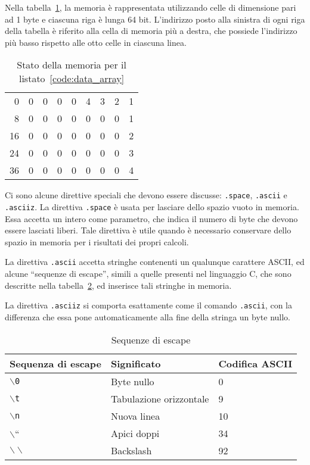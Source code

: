 \documentclass[12pt]{report}
\begin{document}
Nella tabella~\ref{table:effect}, la memoria \`{e} rappresentata utilizzando celle di dimensione pari 
ad 1 byte e ciascuna riga \`{e} lunga 64 bit. L'indirizzo posto alla sinistra di ogni riga della tabella \`{e} 
riferito alla cella di memoria pi\`{u} a destra, che possiede l'indirizzo pi\`{u} basso rispetto alle otto celle in ciascuna linea.

\begin{table}[htb]
	\begin{centering}
		\begin{tabular}{r|c|c|c|c|c|c|c|c|}
			\cline{2-9}
			0 & 0 & 0 & 0 & 0 &4 & 3 &2 &1 \\
			\cline{2-9}
			8 & 0 & 0 & 0 & 0 &0 & 0 &0 &1 \\
			\cline{2-9}
			16 & 0 & 0 & 0 & 0 &0 & 0 &0 &2 \\
			\cline{2-9}
			24 & 0 & 0 & 0 & 0 &0 & 0 &0 &3 \\
			\cline{2-9}
			36 & 0 & 0 & 0 & 0 &0 & 0 &0 &4\\ 
			\cline{2-9}
		\end{tabular}
		\caption{Stato della memoria per il listato~\ref{code:data_array}}
		\label{table:effect}
	\end{centering}
\end{table}
Ci sono alcune direttive speciali che devono essere discusse: \texttt{.space}, 
\texttt{.ascii} e \texttt{.asciiz}.
La direttiva \texttt{.space} \`{e} usata per lasciare dello spazio vuoto in memoria. 
Essa accetta un intero come parametro, che indica il numero di byte che devono essere lasciati liberi. 
Tale direttiva \`{e} utile quando \`{e} necessario conservare dello spazio in memoria per i risultati dei propri calcoli.

La direttiva \texttt{.ascii} accetta stringhe contenenti un qualunque carattere ASCII, 
ed alcune ``sequenze di escape'', simili a quelle presenti nel linguaggio C, che sono descritte nella 
tabella~\ref{table:escaping}, ed inserisce tali stringhe in memoria.

La direttiva \texttt{.asciiz} si comporta esattamente come il comando \texttt{.ascii},
con la differenza che essa pone automaticamente alla fine della stringa un byte nullo.

\begin{table}[!htb]
	\begin{tabular}{lll}
		\hline
		\hline
		Sequenza di escape & Significato & Codifica ASCII\\
		\hline
		\texttt{$\backslash$0} & Byte nullo & 0\\
		\texttt{$\backslash$t} & Tabulazione orizzontale & 9\\
		\texttt{$\backslash$n} & Nuova linea & 10\\
		\texttt{$\backslash$}`` & Apici doppi & 34\\
		\texttt{$\backslash\backslash$} & Backslash & 92
	\end{tabular}
	\caption{Sequenze di escape}
	\label{table:escaping}
\end{table}
\end{document}

